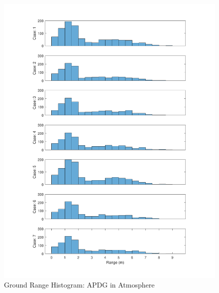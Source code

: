 \begin{figure}[H]
	\centering
	\begin{minipage}{4.3 in}
		\includegraphics[width=\linewidth]{Figures/hrngdisppowatmo.pdf}
		\caption{Ground Range Histogram: APDG in Atmosphere \label{fig:hrngdisppowatmo} }
	\end{minipage}
\end{figure}



